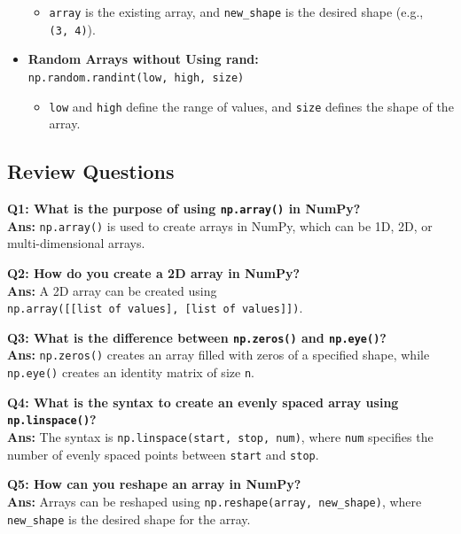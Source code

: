 \documentclass[
  letterpaper,
  DIV=11,
  numbers=noendperiod]{scrreprt}
\providecommand{\tightlist}{%
  \setlength{\itemsep}{0pt}\setlength{\parskip}{0pt}}\usepackage{longtable,booktabs,array}
\theoremstyle{plain}
\theoremstyle{definition}
\theoremstyle{remark}
\begin{document}
\begin{tcolorbox}
\begin{itemize}
  \begin{itemize}
  \tightlist
  \item
    \texttt{array} is the existing array, and \texttt{new\_shape} is the
    desired shape (e.g., \texttt{(3,\ 4)}).
  \end{itemize}
\item
  \textbf{Random Arrays without Using rand:}
  \texttt{np.random.randint(low,\ high,\ size)}

  \begin{itemize}
  \tightlist
  \item
    \texttt{low} and \texttt{high} define the range of values, and
    \texttt{size} defines the shape of the array.
  \end{itemize}
\end{itemize}

\end{tcolorbox}

\subsection{Review Questions}\label{review-questions}

\textbf{Q1: What is the purpose of using \texttt{np.array()} in
NumPy?}\\
\textbf{Ans:} \texttt{np.array()} is used to create arrays in NumPy,
which can be 1D, 2D, or multi-dimensional arrays.

\textbf{Q2: How do you create a 2D array in NumPy?}\\
\textbf{Ans:} A 2D array can be created using
\texttt{np.array({[}{[}list\ of\ values{]},\ {[}list\ of\ values{]}{]})}.

\textbf{Q3: What is the difference between \texttt{np.zeros()} and
\texttt{np.eye()}?}\\
\textbf{Ans:} \texttt{np.zeros()} creates an array filled with zeros of
a specified shape, while \texttt{np.eye()} creates an identity matrix of
size \texttt{n}.

\textbf{Q4: What is the syntax to create an evenly spaced array using
\texttt{np.linspace()}?}\\
\textbf{Ans:} The syntax is \texttt{np.linspace(start,\ stop,\ num)},
where \texttt{num} specifies the number of evenly spaced points between
\texttt{start} and \texttt{stop}.

\textbf{Q5: How can you reshape an array in NumPy?}\\
\textbf{Ans:} Arrays can be reshaped using
\texttt{np.reshape(array,\ new\_shape)}, where \texttt{new\_shape} is
the desired shape for the array.
\end{document}
